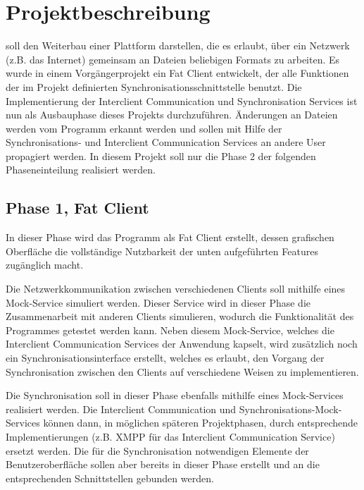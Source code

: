 
\section{Projektbeschreibung}

\sepmprojectname soll den Weiterbau einer Plattform darstellen, die es erlaubt, über ein Netzwerk (z.B. das Internet) gemeinsam an Dateien beliebigen Formats zu arbeiten. Es wurde in einem Vorgängerprojekt ein Fat Client entwickelt, der alle Funktionen der im Projekt definierten Synchronisationsschnittstelle benutzt. Die Implementierung der Interclient Communication und Synchronisation Services ist nun als Ausbauphase dieses Projekts durchzuführen. Änderungen an Dateien werden vom Programm erkannt werden und sollen mit Hilfe der Synchronisations- und Interclient Communication Services an andere User propagiert werden. In diesem Projekt soll nur die Phase 2 der folgenden Phaseneinteilung realisiert werden.

\subsection{Phase 1, Fat Client}
In dieser Phase wird das Programm als Fat Client erstellt, dessen grafischen Oberfläche die vollständige Nutzbarkeit der unten aufgeführten Features zugänglich macht. 

Die Netzwerkkommunikation zwischen verschiedenen Clients soll mithilfe eines Mock-Service simuliert werden. Dieser Service wird in dieser Phase die Zusammenarbeit mit anderen Clients simulieren, wodurch die Funktionalität des Programmes getestet werden kann. Neben diesem Mock-Service, welches die Interclient Communication Services der Anwendung kapselt, wird zusätzlich noch ein Synchronisationsinterface erstellt, welches es erlaubt, den Vorgang der Synchronisation zwischen den Clients auf verschiedene Weisen zu implementieren.

Die Synchronisation soll in dieser Phase ebenfalls mithilfe eines Mock-Services realisiert werden. Die Interclient Communication und Synchronisations-Mock-Services können dann, in möglichen späteren Projektphasen, durch entsprechende Implementierungen (z.B. XMPP für das Interclient Communication Service) ersetzt werden. Die für die Synchronisation notwendigen Elemente der Benutzeroberfläche sollen aber bereits in dieser Phase erstellt und an die entsprechenden Schnittstellen gebunden werden. 

